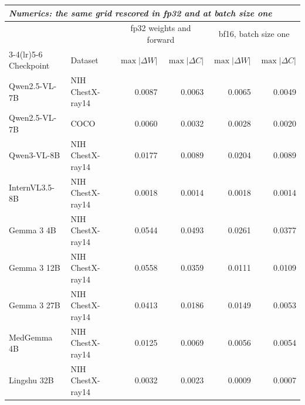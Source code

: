 \documentclass{article}
\begin{document}
\begin{table}[h]
\medskip
\setlength{\tabcolsep}{5pt}
\begin{tabular}{llrrrr}
\toprule
\multicolumn{6}{l}{\textit{Numerics: the same grid rescored in fp32 and at batch size one}} \\
\midrule
 & & \multicolumn{2}{c}{fp32 weights and forward} & \multicolumn{2}{c}{bf16, batch size one} \\
\cmidrule(lr){3-4}\cmidrule(lr){5-6}
Checkpoint & Dataset & $\max|\Delta W|$ & $\max|\Delta C|$ & $\max|\Delta W|$ & $\max|\Delta C|$ \\
\midrule
Qwen2.5-VL-7B & NIH ChestX-ray14 & 0.0087 & 0.0063 & 0.0065 & 0.0049 \\
Qwen2.5-VL-7B & COCO & 0.0060 & 0.0032 & 0.0028 & 0.0020 \\
Qwen3-VL-8B & NIH ChestX-ray14 & 0.0177 & 0.0089 & 0.0204 & 0.0089 \\
InternVL3.5-8B & NIH ChestX-ray14 & 0.0018 & 0.0014 & 0.0018 & 0.0014 \\
Gemma 3 4B & NIH ChestX-ray14 & 0.0544 & 0.0493 & 0.0261 & 0.0377 \\
Gemma 3 12B & NIH ChestX-ray14 & 0.0558 & 0.0359 & 0.0111 & 0.0109 \\
Gemma 3 27B & NIH ChestX-ray14 & 0.0413 & 0.0186 & 0.0149 & 0.0053 \\
MedGemma 4B & NIH ChestX-ray14 & 0.0125 & 0.0069 & 0.0056 & 0.0054 \\
Lingshu 32B & NIH ChestX-ray14 & 0.0032 & 0.0023 & 0.0009 & 0.0007 \\
\bottomrule
\end{tabular}
\end{table}
\end{document}
